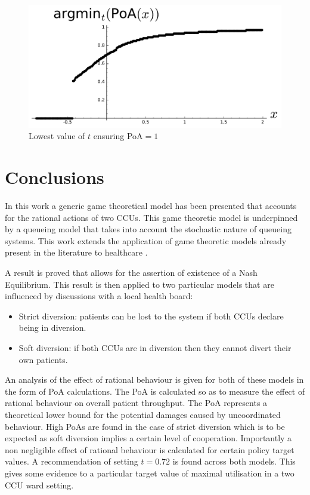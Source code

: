 \documentclass{article}
\begin{document}
\begin{figure}[!htbp]
\begin{center}
\includegraphics[width=12cm]{./Images/argminPoAmodel2.pdf}
\caption{Lowest value of $t$ ensuring PoA$=1$} \label{mintargetvdemandmodel2}
\end{center}
\end{figure}

\section{Conclusions}\label{conclusions}

In this work a generic game theoretical model has been presented that accounts for the rational actions of two CCUs.
This game theoretic model is underpinned by a queueing model that takes into account the stochastic nature of queueing systems.
This work extends the application of game theoretic models already present in the literature to healthcare \cite{li2002cooperative, xie2006note}.

A result is proved that allows for the assertion of existence of a Nash Equilibrium. This result is then applied to two particular models that are influenced by discussions with a local health board:

\begin{itemize}
\item Strict diversion: patients can be lost to the system if both CCUs declare being in diversion.
\item Soft diversion: if both CCUs are in diversion then they cannot divert their own patients.
\end{itemize}

An analysis of the effect of rational behaviour is given for both of these models in the form of PoA calculations.
The PoA is calculated so as to measure the effect of rational behaviour on overall patient throughput.
The PoA represents a theoretical lower bound for the potential damages caused by uncoordinated behaviour.
High PoAs are found in the case of strict diversion which is to be expected as soft diversion implies a certain level of cooperation.
Importantly a non negligible effect of rational behaviour is calculated for certain policy target values.
A recommendation of setting $t=0.72$ is found across both models. This gives some evidence to a particular target value of maximal utilisation in a two CCU ward setting.
\end{document}

